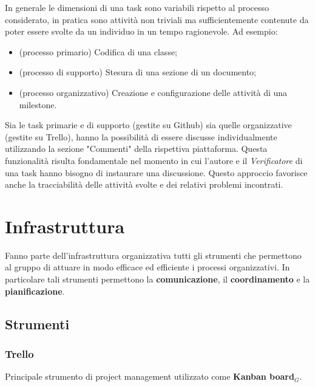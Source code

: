 In generale le dimensioni di una task sono variabili rispetto al processo considerato, in pratica sono attività non triviali ma sufficientemente contenute da poter essere svolte da un individuo in un tempo ragionevole. Ad esempio:
\begin{itemize}
  \item (processo primario) Codifica di una classe;
  \item (processo di supporto) Stesura di una sezione di un documento;
  \item (processo organizzativo) Creazione e configurazione delle attività di una milestone.
\end{itemize}

Sia le task primarie e di supporto (gestite su Github) sia quelle organizzative (gestite su Trello), hanno la possibilità di essere discusse individualmente utilizzando la sezione "Commenti" della rispettiva piattaforma. Questa funzionalità risulta fondamentale nel momento in cui l'autore e il \textit{Verificatore} di una task hanno bisogno di instaurare una discussione. Questo approccio favorisce anche la tracciabilità delle attività svolte e dei relativi problemi incontrati.



\section{Infrastruttura}\label{sec:Infrastruttura}
Fanno parte dell'infrastruttura organizzativa tutti gli strumenti che permettono al gruppo di attuare in modo efficace ed efficiente i processi organizzativi. In particolare tali strumenti permettono la \textbf{comunicazione}, il \textbf{coordinamento} e la \textbf{pianificazione}.

\subsection{Strumenti}
\subsubsection{Trello}
Principale strumento di project management utilizzato come \textbf{Kanban board}$_G$.

